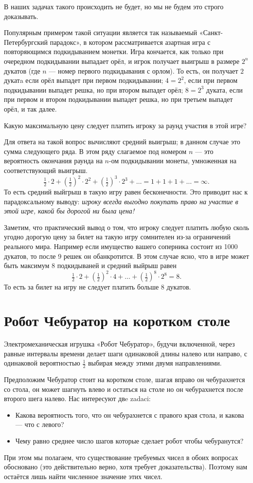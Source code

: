 \documentclass{article}
\begin{document}
В наших задачах такого происходить не будет,
но мы не будем это строго доказывать.

Популярным примером такой ситуации является так называемый «Санкт-Петербургский парадокс», в котором рассматривается азартная игра с повторяющимся подкидыванием монетки. 
Игра кончается, как только при очередном подкидывании выпадает орёл, и игрок получает выигрыш в размере $2^n$ дукатов 
(где $n$ --- номер первого подкидывания с орлом).
То есть, он получает $2$ дукатa если орёл выпадет при первом подкидывании; 
$4=2^2$, если при первом подкидывании выпадет решка, но при втором выпадет орёл; 
$8=2^3$ дуката, 
если при первом и втором подкидывании выпадет решка, 
но при третьем выпадет орёл, 
и так далее. 

Какую максимальную цену следует платить игроку за раунд участия в этой игре? 

Для ответа на такой вопрос вычисляют средний выигрыш; 
в данном случае это сумма следующего ряда.
В этом ряду слагаемое под номером $n$ 
--- это вероятность окончания раунда на $n$-ом подкидывании монеты, умноженная на соответствующий выигрыш.
\[\tfrac12\cdot2+(\tfrac12)^2\cdot2^2+(\tfrac12)^3\cdot2^3+\dots=1+1+1+\dots=\infty.\]
То есть средний выйгрыш в такую игру равен бесконечности.
Это приводит нас к парадоксальному выводу: 
\emph{игроку всегда выгодно покупать право на участие в этой игре, какой бы дорогой ни была цена!}

Заметим, что практический вывод о том, что игроку следует платить любую сколь угодно дорогую цену за билет на такую игру сомнителен из-за ограничений реального мира.
Например если имущество вашего соперника состоит из 1000 дукатов,
то после 9 решек он обанкротится.
В этом случае ясно, что в игре может быть максимум 8 подкидываней
и средний выйрыш равен 
\[\tfrac12\cdot2+(\tfrac12)^2\cdot4+\dots+(\tfrac12)^8\cdot 2^8=8.\]
То есть за билет на игру не следует платить больше 8 дукатов.


\section{Робот Чебуратор на коротком столе} 

Электромеханическая игрушка «Робот Чебуратор», 
будучи включенной, через равные интервалы времени делает шаги одинаковой длины налево или направо, с одинаковой вероятностью $\tfrac12$ выбирая между этими двумя направлениями. 

Предположим Чебуратор стоит на коротком столе,
шагая вправо он чебурахнется со стола,
он может шагнуть влево и остаться на столе но он чебурахнется после второго шега налево.
Нас интересуют двe zadaci:
\begin{itemize}
\item Какова вероятность того, что он чебурахнется с правого края стола, и какова --- что с левого?
\item Чему равно среднее число шагов которые сделает робот чтобы чебуранутся?
\end{itemize}
При этом мы полагаем, что существование требуемых чисел в обоих вопросах обосновано
(это действительно верно, хотя требует доказательства).
Поэтому нам остаётся лишь найти
численное значение этих чисел. 
\end{document}
